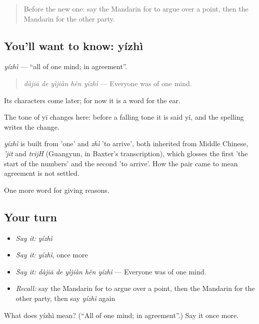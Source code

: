 \label{lesson:ZH-C348-yizhi}



\begin{quote}
Before the new one: say the Mandarin for to argue over a point, then the Mandarin for the other party.
\end{quote}

\subsection*{You'll want to know: yízhì}
\emph{yízhì} — \textquotedblleft{}all of one mind; in agreement\textquotedblright{}.

\begin{quote}
\emph{dàjiā de yìjiàn hěn yízhì} — Everyone was of one mind.
\end{quote}

Its characters come later; for now it is a word for the ear.

The tone of yī changes here: before a falling tone it is said yí, and the spelling writes the change.

\begin{cousinweb}
\emph{yízhì} is built from  'one' and \emph{zhì} 'to arrive', both inherited from Middle Chinese, \emph{'jit} and \emph{trijH} (Guangyun, in Baxter's transcription), which glosses the first 'the start of the numbers' and the second 'to arrive'. How the pair came to mean agreement is not settled.
\end{cousinweb}

\begin{grammarlens}[title={What you've built}]
One more word for giving reasons.
\end{grammarlens}

\subsection*{Your turn}
\begin{itemize}
\raggedright
  \item \emph{Say it:} \emph{yízhì}
  \item \emph{Say it:} \emph{yízhì}, once more
  \item \emph{Say it:} \emph{dàjiā de yìjiàn hěn yízhì} — Everyone was of one mind.
  \item \emph{Recall:} say the Mandarin for to argue over a point, then the Mandarin for the other party, then say \emph{yízhì} again
\end{itemize}

\begin{tcolorbox}[breakable,colback=teal!4,colframe=teal!35!black,title={Before you move on}]
What does yízhì mean? (\textquotedblleft{}All of one mind; in agreement\textquotedblright{}.) Say it once more.
\end{tcolorbox}
